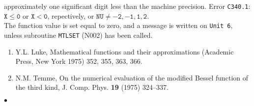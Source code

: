 approximately one significant digit less than the machine precision.
\Errorh
Error {\tt C340.1}: $\mathtt{X \le 0}$ or $\mathtt{X<0}$, repectively,
or $\mathtt{NU \ne -2,-1,1,2}$. \\
The function value is set equal to zero, and a message is written on
{\tt Unit 6}, unless subroutine {\tt MTLSET} (N002) has been called.
\Refer
\begin{enumerate}
\item Y.L. Luke, Mathematical functions and their
approximations (Academic Press, New York 1975) 352, 355, 363, 366.
\item N.M. Temme, On the numerical evaluation of the modified Bessel
function of the third kind, J. Comp. Phys. {\bf 19} (1975) 324--337.
\end{enumerate}
$\bullet$
